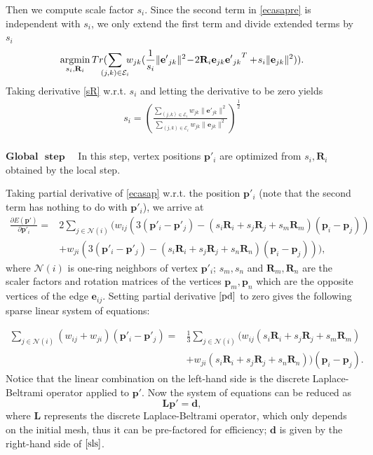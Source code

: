 Then we compute scale factor $s_i$. Since the second term in \eqref{ecasapre} is independent with $s_i$, we only extend the first term and divide extended terms by $s_i$
\begin{align}
 \argmin_{s_i,\mathbf R_i} Tr(\!\!\!\!\sum_{(j,k)\in\mathcal{E}_i}\!\!\!w_{jk}(\frac{1}{s_i}\|\mathbf {e'}_{jk}\|^2\!-\!2\mathbf R_i\mathbf e_{jk}{\mathbf {e'}_{jk}}^T + \!s_i\|\mathbf e_{jk}\|^2)). \label{sR}
\end{align}
Taking derivative \eqref{sR} w.r.t. $s_i$ and letting the derivative to be zero yields
\begin{align}\label{s}
s_i = {\left(\frac{\displaystyle \sum_{(j,k)\in\mathcal{E}_i}w_{jk}\|\mathbf e'_{jk}\|^2}{\displaystyle \sum_{(j,k)\in\mathcal{E}_i}w_{jk}\|\mathbf e_{jk}\|^2}\right)}^{\frac{1}{2}}
\end{align}\\

$\textbf{Global}$ $\textbf{ step}$ ~~In this step, vertex positions $\mathbf p'_i$ are optimized from $s_i, \mathbf R_i$ obtained by the local step.

Taking partial derivative of \eqref{ecasap} w.r.t. the position $\mathbf p'_i$ (note that the second term has nothing to do with $\mathbf p'_i$), we arrive at
\begin{align}\label{pd}
\frac{\partial E(\mathbf p')}{\partial \mathbf p'_i} =&2 \sum_{j \in \mathcal{N}(i)}\!(\!w_{ij}(3(\mathbf p'_i\!-\!\mathbf p'_j\!)\!-\!(\!s_i\mathbf R_i\!+\!s_j\mathbf R_j\!+\!s_m\mathbf R_m\!)(\mathbf p_i\!-\!\mathbf p_j\!))\nonumber\\
&+\!w_{ji}(3(\mathbf p'_i\!-\!\mathbf p'_j\!)\!-\!(s_i\mathbf R_i\!+\!s_j\mathbf R_j\!+\!s_n\mathbf R_n\!)(\mathbf p_i\!-\!\mathbf p_j\!))),
\end{align}
where $\mathcal{N}(i)$ is one-ring neighbors of vertex $\mathbf p'_i$; $s_m, s_n$ and $\mathbf R_m, \mathbf R_n$ are the scaler factors and rotation matrices of the vertices $\mathbf p_m, \mathbf p_n$ which are the opposite vertices of the edge $\mathbf e_{ij}$. Setting partial derivative $\eqref{pd}$ to zero gives the following sparse linear system of equations:

\begin{align}\label{sls}
\sum_{j \in \mathcal{N}(i)}(w_{ij}\!+\!w_{ji})(\mathbf p'_i-\mathbf p'_j)=&\frac{1}{3}\!\sum_{j \in \mathcal{N}(i)}\!(w_{ij}(s_i \mathbf R_i\!+\!s_j\mathbf R_j\!+\!s_m \mathbf R_m\!)\! \nonumber\\
&+\!w_{ji}(s_i \mathbf R_i\!+\!s_j \mathbf R_j\!+\!s_n \mathbf R_n))(\mathbf p_i\!-\!\mathbf p_j\!).
\end{align}
Notice that the linear combination on the left-hand side is the discrete Laplace-Beltrami operator applied to $\mathbf p'$. Now the system of equations can be reduced as \begin{equation}\label{DeformationLinearSystem}
\mathbf L\mathbf p' = \mathbf d,
\end{equation} where $\mathbf L$ represents the discrete Laplace-Beltrami operator, which only depends on the initial mesh, thus it can be pre-factored for efficiency; $\mathbf d$ is given by the right-hand side of $\eqref{sls}$.\\

